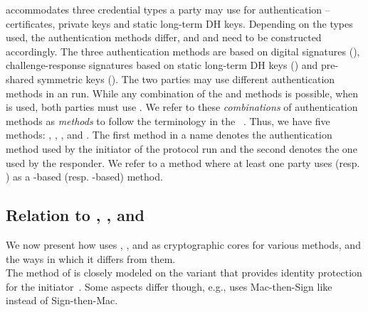 \mEdhoc{} accommodates three credential types
a party may use for authentication -- certificates, private keys
and static long-term DH keys.
%
Depending on the types used, the authentication methods differ,
and \mAuthi{} and \mAuthr{} need to be constructed accordingly.
%
The three authentication methods are based on digital signatures (\mSig),
challenge-response signatures based on static long-term DH keys (\mStat) and
pre-shared symmetric keys (\mPsk).
%
The two parties may use different authentication methods in an \mEdhoc{} run.
%
While any combination of the \mSig{} and \mStat{} methods is possible,
when \mPsk{} is used, both parties must use \mPsk{}.
%
We refer to these \emph{combinations} of authentication methods as
\emph{methods} to follow the terminology in the
\mSpec{}~\cite{selander-lake-edhoc-01}.
%
Thus, we have five methods: \mSigSig, \mSigStat, \mStatStat, \mStatSig{} and
\mPskPsk.
%
The first method in a name denotes the
authentication method used by the initiator of the protocol run and the second denotes the
one used by the responder.
%
We refer to a method where at least one party uses \mSig{} (resp. \mStat) as a \mSig-based (resp. \mStat-based)
method.
%

%

 
\subsection{Relation to \mSigma, \mOptls{}, and \mNoise{}}
\label{sec:relationsToOtherProtocols}
We now present how \mEdhoc{} uses \mSigma, \mOptls{}, and \mNoise{} as
cryptographic cores for various methods, and the ways in which it differs from them.
\\
%
%

\runhead{\mSigma{}}
\label{sec:sigma}
The \mSigSig{} method of \mEdhoc{} is closely modeled on the \mSigma{}
variant that provides identity protection for the initiator~\cite{sigma}.
%
Some aspects differ though, e.g., \mSigSig{} uses Mac-then-Sign like
\mTls{} instead of Sign-then-Mac. 
%
\\

